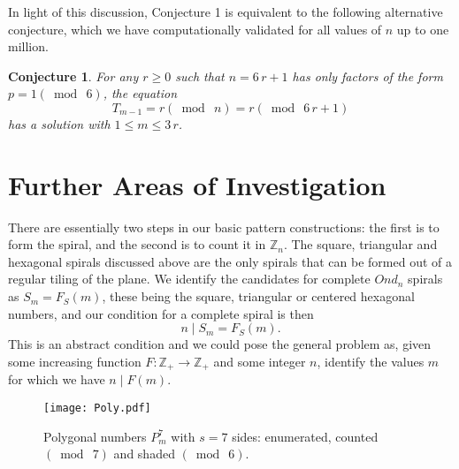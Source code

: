 \documentclass{article}
\newtheorem{conj}{Conjecture}
\theoremstyle{definition}
\def\ZZ{\mathbb{Z}}
\def\pmod#1{(\bmod\  #1)}
\begin{document}
In light of this discussion, Conjecture 1 is equivalent to the
following alternative conjecture, which we have computationally
validated for all values of $n$ up to one million.

\begin{conj}
For any $r\ge 0$ such that $n=6\,r+1$ has only factors of the form
$p=1\pmod6$, the equation
\[
  T_{m-1} = r\pmod n = r \pmod{6\,r+1}
\]
has a solution with $1\le m\le 3\,r$.
\end{conj}


\section{Further Areas of Investigation}

There are essentially two steps in our basic pattern constructions:
the first is to form the spiral, and the second is to count it in
$\ZZ_n$.  The square, triangular and hexagonal spirals discussed above
are the only spirals that can be formed out of a regular tiling of the
plane.  We identify the candidates for complete $Ond_n$ spirals as
$S_m = F_S(m)$, these being the square, triangular or centered hexagonal
numbers, and our condition for a complete spiral is then
\[
  n \mid S_m = F_S(m).
\]
This is an abstract condition and we could pose the general problem
as, given some increasing function $F:\ZZ_+\to\ZZ_+$ and some integer
$n$, identify the values $m$ for which we have $n\mid F(m)$.

\begin{figure}[htb]
  \centering
  \texttt{[image: Poly.pdf]}
  \caption{Polygonal numbers $P^7_m$ with $s=7$ sides: enumerated,
    counted $\pmod 7$ and shaded $\pmod 6$.}
  \label{fig:poly}
\end{figure}
\end{document}
